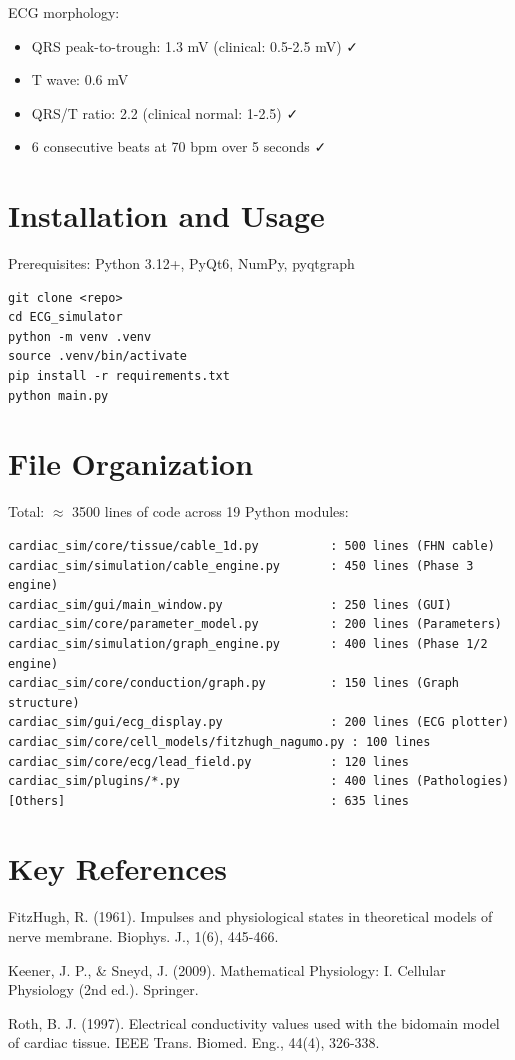 \documentclass[12pt,a4paper]{article}
\begin{document}
ECG morphology:
\begin{itemize}
\item QRS peak-to-trough: 1.3 mV (clinical: 0.5-2.5 mV) ✓
\item T wave: 0.6 mV 
\item QRS/T ratio: 2.2 (clinical normal: 1-2.5) ✓
\item 6 consecutive beats at 70 bpm over 5 seconds ✓
\end{itemize}

\section*{Installation and Usage}

Prerequisites: Python 3.12+, PyQt6, NumPy, pyqtgraph

\begin{verbatim}
git clone <repo>
cd ECG_simulator
python -m venv .venv
source .venv/bin/activate
pip install -r requirements.txt
python main.py
\end{verbatim}

\section*{File Organization}

Total: $\approx$ 3500 lines of code across 19 Python modules:

\begin{verbatim}
cardiac_sim/core/tissue/cable_1d.py          : 500 lines (FHN cable)
cardiac_sim/simulation/cable_engine.py       : 450 lines (Phase 3 engine)
cardiac_sim/gui/main_window.py               : 250 lines (GUI)
cardiac_sim/core/parameter_model.py          : 200 lines (Parameters)
cardiac_sim/simulation/graph_engine.py       : 400 lines (Phase 1/2 engine)
cardiac_sim/core/conduction/graph.py         : 150 lines (Graph structure)
cardiac_sim/gui/ecg_display.py               : 200 lines (ECG plotter)
cardiac_sim/core/cell_models/fitzhugh_nagumo.py : 100 lines
cardiac_sim/core/ecg/lead_field.py           : 120 lines
cardiac_sim/plugins/*.py                     : 400 lines (Pathologies)
[Others]                                     : 635 lines
\end{verbatim}

\section*{Key References}

FitzHugh, R. (1961). Impulses and physiological states in theoretical models of nerve membrane. Biophys. J., 1(6), 445-466.

Keener, J. P., \& Sneyd, J. (2009). Mathematical Physiology: I. Cellular Physiology (2nd ed.). Springer.

Roth, B. J. (1997). Electrical conductivity values used with the bidomain model of cardiac tissue. IEEE Trans. Biomed. Eng., 44(4), 326-338.
\end{document}
